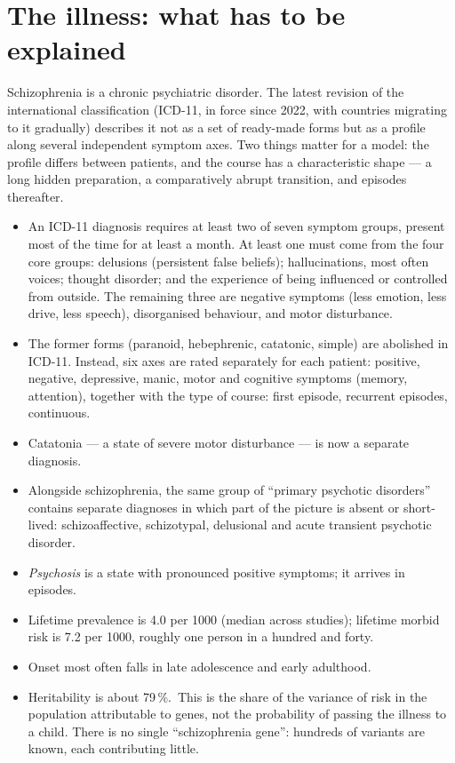 \section{The illness: what has to be explained}
Schizophrenia is a chronic psychiatric disorder. The latest revision of the international classification (ICD-11, in force since 2022, with countries migrating to it gradually) describes it not as a set of ready-made forms but as a profile along several independent symptom axes. Two things matter for a model: the profile differs between patients, and the course has a characteristic shape --- a long hidden preparation, a comparatively abrupt transition, and episodes thereafter.
\facts
\begin{itemize}
\item An ICD-11 diagnosis requires at least two of seven symptom groups, present most of the time for at least a month. At least one must come from the four core groups: delusions (persistent false beliefs); hallucinations, most often voices; thought disorder; and the experience of being influenced or controlled from outside. The remaining three are negative symptoms (less emotion, less drive, less speech), disorganised behaviour, and motor disturbance.\tP
\item The former forms (paranoid, hebephrenic, catatonic, simple) are abolished in ICD-11. Instead, six axes are rated separately for each patient: positive, negative, depressive, manic, motor and cognitive symptoms (memory, attention), together with the type of course: first episode, recurrent episodes, continuous.\tP
\item Catatonia --- a state of severe motor disturbance --- is now a separate diagnosis.\tP
\item Alongside schizophrenia, the same group of ``primary psychotic disorders'' contains separate diagnoses in which part of the picture is absent or short-lived: schizoaffective, schizotypal, delusional and acute transient psychotic disorder.\tP
\item \emph{Psychosis} is a state with pronounced positive symptoms; it arrives in episodes.\tU
\item Lifetime prevalence is 4.0 per 1000 (median across studies); lifetime morbid risk is 7.2 per 1000, roughly one person in a hundred and forty.\tP
\item Onset most often falls in late adolescence and early adulthood.\tU
\item Heritability is about 79\,\%.\tP\ This is the share of the variance of risk in the population attributable to genes, not the probability of passing the illness to a child. There is no single ``schizophrenia gene'': hundreds of variants are known, each contributing little.\tU

\end{itemize}
